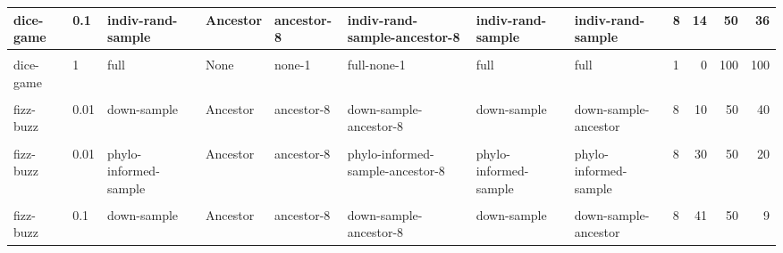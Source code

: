 \documentclass[
]{book}
\begin{document}
\begin{table}
\begin{tabular}{l|l|l|l|l|l|l|l|l|r|r|r}
\hline
dice-game & 0.1 & indiv-rand-sample & Ancestor & ancestor-8 & indiv-rand-sample-ancestor-8 & indiv-rand-sample & indiv-rand-sample & 8 & 14 & 50 & 36\\
\hline
\cellcolor{gray!6}{dice-game} & \cellcolor{gray!6}{0.1} & \cellcolor{gray!6}{phylo-informed-sample} & \cellcolor{gray!6}{Ancestor} & \cellcolor{gray!6}{ancestor-8} & \cellcolor{gray!6}{phylo-informed-sample-ancestor-8} & \cellcolor{gray!6}{phylo-informed-sample} & \cellcolor{gray!6}{phylo-informed-sample} & \cellcolor{gray!6}{8} & \cellcolor{gray!6}{18} & \cellcolor{gray!6}{50} & \cellcolor{gray!6}{32}\\
\hline
dice-game & 1 & full & None & none-1 & full-none-1 & full & full & 1 & 0 & 100 & 100\\
\hline
\cellcolor{gray!6}{fizz-buzz} & \cellcolor{gray!6}{0.01} & \cellcolor{gray!6}{down-sample} & \cellcolor{gray!6}{None} & \cellcolor{gray!6}{none-1} & \cellcolor{gray!6}{down-sample-none-1} & \cellcolor{gray!6}{down-sample} & \cellcolor{gray!6}{down-sample} & \cellcolor{gray!6}{1} & \cellcolor{gray!6}{5} & \cellcolor{gray!6}{50} & \cellcolor{gray!6}{45}\\
\hline
fizz-buzz & 0.01 & down-sample & Ancestor & ancestor-8 & down-sample-ancestor-8 & down-sample & down-sample-ancestor & 8 & 10 & 50 & 40\\
\hline
\cellcolor{gray!6}{fizz-buzz} & \cellcolor{gray!6}{0.01} & \cellcolor{gray!6}{indiv-rand-sample} & \cellcolor{gray!6}{Ancestor} & \cellcolor{gray!6}{ancestor-8} & \cellcolor{gray!6}{indiv-rand-sample-ancestor-8} & \cellcolor{gray!6}{indiv-rand-sample} & \cellcolor{gray!6}{indiv-rand-sample} & \cellcolor{gray!6}{8} & \cellcolor{gray!6}{26} & \cellcolor{gray!6}{50} & \cellcolor{gray!6}{24}\\
\hline
fizz-buzz & 0.01 & phylo-informed-sample & Ancestor & ancestor-8 & phylo-informed-sample-ancestor-8 & phylo-informed-sample & phylo-informed-sample & 8 & 30 & 50 & 20\\
\hline
\cellcolor{gray!6}{fizz-buzz} & \cellcolor{gray!6}{0.1} & \cellcolor{gray!6}{down-sample} & \cellcolor{gray!6}{None} & \cellcolor{gray!6}{none-1} & \cellcolor{gray!6}{down-sample-none-1} & \cellcolor{gray!6}{down-sample} & \cellcolor{gray!6}{down-sample} & \cellcolor{gray!6}{1} & \cellcolor{gray!6}{39} & \cellcolor{gray!6}{50} & \cellcolor{gray!6}{11}\\
\hline
fizz-buzz & 0.1 & down-sample & Ancestor & ancestor-8 & down-sample-ancestor-8 & down-sample & down-sample-ancestor & 8 & 41 & 50 & 9\\

\end{tabular}
\end{table}
\end{document}
